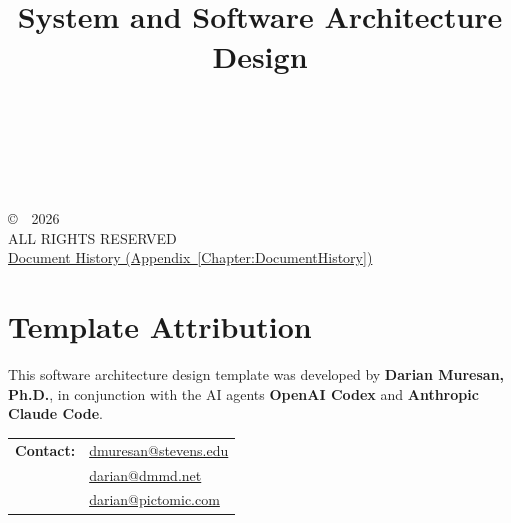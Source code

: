 \title{\ProjectName\\[0.5em]\large System and Software Architecture Design\\[1.5em]\normalsize\VERSION\\\DocumentStatus}
\author{\DocumentOwner\\\Organization}
\conferraldate{}{\DocumentDate}
\copyrightholder{\Organization}
\maketitle

\begin{copyrightpage}
\copyright\ \Organization\ 2026 \\
ALL RIGHTS RESERVED \\[0.2in]
\hyperref[Chapter:DocumentHistory]{Document History (Appendix~\ref*{Chapter:DocumentHistory})}
\end{copyrightpage}

\cleardoublepage
{}
\chapter*{Template Attribution}

This software architecture design template was developed by
\textbf{Darian Muresan, Ph.D.}, in conjunction with the AI agents
\textbf{OpenAI Codex} and \textbf{Anthropic Claude Code}.

\begin{tabularx}{\linewidth}{@{}L{3.0cm}Y@{}}
\textbf{Contact:} & \href{mailto:dmuresan@stevens.edu}{dmuresan@stevens.edu}\\
& \href{mailto:darian@dmmd.net}{darian@dmmd.net}\\
& \href{mailto:darian@pictomic.com}{darian@pictomic.com}
\end{tabularx}

\clearpage
\begin{abstract}
  
\end{abstract}

\contentspage
\tablelistpage
\figurelistpage
